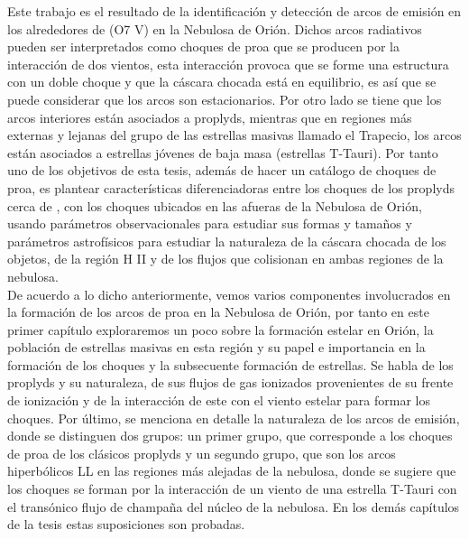 % 


% 

\label{chap:introduction}

Este trabajo es el resultado de la identificación y detección de arcos de emisión en los alrededores de \thC{} (O7 V) en la Nebulosa de Orión. Dichos arcos radiativos pueden ser interpretados como choques de proa que se producen por la interacción de dos vientos, esta interacción provoca que se forme una estructura con un doble choque y que la cáscara chocada está en equilibrio, es así que se puede considerar que los arcos son estacionarios. Por otro lado se tiene que los arcos interiores están asociados a proplyds, mientras que en regiones más externas y lejanas del grupo de las estrellas masivas llamado el Trapecio, los arcos están asociados a estrellas jóvenes de baja masa (estrellas T-Tauri). Por tanto uno de los objetivos de esta tesis, además de hacer un catálogo de choques de proa, es plantear características diferenciadoras entre los choques de los proplyds cerca de \thC{}, con los choques ubicados en las afueras de la Nebulosa de Orión, usando parámetros observacionales para estudiar sus formas y tamaños y parámetros astrofísicos para estudiar la naturaleza de la cáscara chocada de los objetos, de la región H II y de los flujos que colisionan en ambas regiones de la nebulosa. \\

De acuerdo a lo dicho anteriormente, vemos varios componentes involucrados en la formación de los arcos de proa en la Nebulosa de Orión, por tanto en este primer capítulo exploraremos un poco sobre la formación estelar en Orión, la población de estrellas masivas en esta región y su papel e importancia en la formación de los choques y la subsecuente formación de estrellas. Se habla de los proplyds y su naturaleza, de sus flujos de gas ionizados provenientes de su frente de ionización y de la interacción de este con el viento estelar para formar los choques. Por último, se menciona en detalle la naturaleza de los arcos de emisión, donde se distinguen dos grupos: un primer grupo, que corresponde a los choques de proa de los clásicos proplyds y un segundo grupo, que son los arcos hiperbólicos LL en las regiones más alejadas de la nebulosa, donde se sugiere que los choques se forman por la interacción de un viento de una estrella T-Tauri con el transónico flujo de champaña del núcleo de la nebulosa. En los demás capítulos de la tesis estas suposiciones son probadas.                

